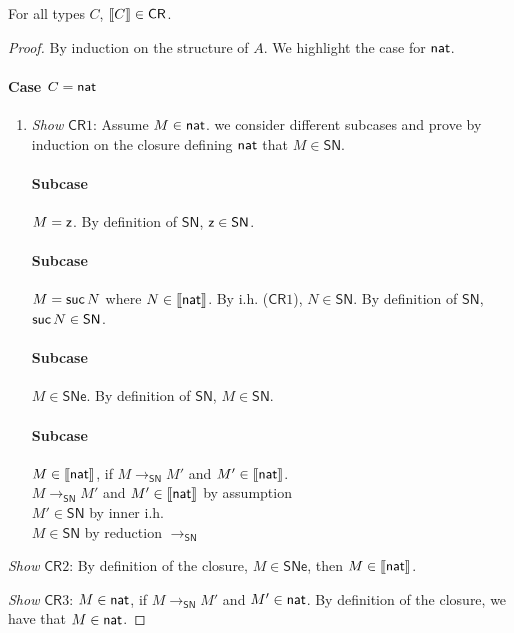 \documentclass{article}
\newcommand{\SN}{\mathsf{SN}}
\newcommand{\SNe}{\mathsf{SNe}}
\newcommand{\CR}{\mathsf{CR}}
\newcommand{\redSN}{\longrightarrow_\SN}
\def\lv{\mathopen{{[\kern-0.14em[}}}    %
\def\rv{\mathclose{{]\kern-0.14em]}}}   %
\newcommand{\den}[1]{\lv #1 \rv}
\begin{document}
\begin{theorem}
For all types $C$, $\den{C}  \in \CR$.
\end{theorem}
\begin{proof}
By induction on the structure of $A$. We highlight the case for $\mathsf{nat}$.

\paragraph{Case $C = \mathsf{nat}$}

\begin{enumerate}
\item \textit{Show} $\CR1$: Assume $M \in \mathsf{nat}$. we consider different subcases
  and prove by induction on the closure defining $\mathsf{nat}$ that $M \in \SN$.
%

\paragraph{Subcase } $M = \mathsf{z}$. By definition of $\SN$, $\zero \in \SN$.

\paragraph{Subcase } $M = {\mathsf{suc}}\, N$ where $N \in \den{\nat}$.  By i.h. ($\CR1$),
$N \in \SN$. By definition of $\SN$, $\suc N \in \SN$.

 \paragraph{Subcase} $M \in \SNe$. By definition of $\SN$, $M \in \SN$.

 \paragraph{Subcase} $M \in \den{\nat}$, if $M \redSN M'$ and $M' \in \den{\nat}$. 
 \\
 $M \redSN M'$ and $M' \in \den{\nat}$ \hfill by assumption \\
 $M' \in \SN$ \hfill by inner i.h. \\
 $M \in \SN$ \hfill by reduction $\redSN$
 \end{enumerate}


 \item \textit{Show} $\CR2$: By definition of the closure, $M \in \SNe$, then $M
   \in \den{\nat}$. 

 \item \textit{Show} $\CR3$: $M \in \mathsf{nat}$, if $M \redSN M'$ and $M' \in \mathsf{nat}$. By
   definition of the closure, we have that $M \in \mathsf{nat}$.
 \end{proof}
\end{document}
